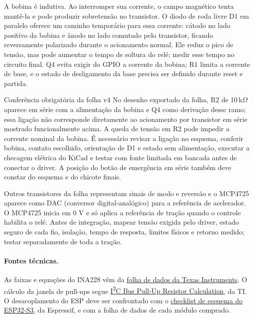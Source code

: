 A bobina é indutiva. Ao interromper sua corrente, o campo magnético tenta mantê-la e pode produzir sobretensão no transistor. O diodo de roda livre D1 em paralelo oferece um caminho temporário para essa corrente: cátodo no lado positivo da bobina e ânodo no lado comutado pelo transistor, ficando reversamente polarizado durante o acionamento normal. Ele reduz o pico de tensão, mas pode aumentar o tempo de soltura do relé; medir esse tempo no circuito final. Q4 evita exigir do GPIO a corrente da bobina; R1 limita a corrente de base, e o estado de desligamento da base precisa ser definido durante reset e partida.

\begin{nota}{Conferência obrigatória da folha v4}
No desenho exportado da folha, R2 de 10\,k$\Omega$ aparece em série com a alimentação da bobina e Q4 como derivação desse ramo; essa ligação não corresponde diretamente ao acionamento por transistor em série mostrado funcionalmente acima. A queda de tensão em R2 pode impedir a corrente nominal da bobina. É necessário revisar a ligação no esquema, conferir bobina, contato escolhido, orientação de D1 e estado sem alimentação, executar a checagem elétrica do KiCad e testar com fonte limitada em bancada antes de conectar o driver. A posição do botão de emergência em série também deve constar do esquema e do chicote finais.
\end{nota}

Outros transistores da folha representam sinais de modo e reversão e o MCP4725 aparece como DAC (conversor digital-analógico) para a referência de acelerador. O MCP4725 inicia em 0 V e só aplica a referência de tração quando o controle habilita o relé. Antes de integração, mapear tensão exigida pelo driver, estado seguro de cada fio, isolação, tempo de resposta, limites físicos e retorno medido; testar separadamente de toda a tração.

\paragraph{Fontes técnicas.}
As faixas e equações do INA228 vêm da \href{https://www.ti.com/lit/ds/symlink/ina228.pdf}{folha de dados da Texas Instruments}. O cálculo da janela de pull-ups segue \href{https://www.ti.com/lit/an/slva689/slva689.pdf}{I\textsuperscript{2}C Bus Pull-Up Resistor Calculation}, da TI. O desacoplamento do ESP deve ser confrontado com o \href{https://docs.espressif.com/projects/esp-hardware-design-guidelines/en/latest/esp32s3/schematic-checklist.html}{checklist de esquema do ESP32-S3}, da Espressif, e com a folha de dados de cada módulo comprado.
